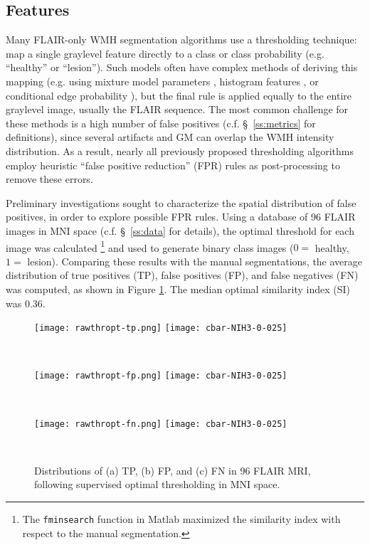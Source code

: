 \subsection{Features}
Many FLAIR-only WMH segmentation algorithms use a thresholding technique: map a single graylevel feature directly to a class or class probability (e.g. ``healthy'' or ``lesion''). Such models often have complex methods of deriving this mapping (e.g. using mixture model parameters \cite{Roura2015}, histogram features \cite{Yoo2014}, or conditional edge probability \cite{Knight2016}), but the final rule is applied equally to the entire graylevel image, usually the FLAIR sequence. The most common challenge for these methods is a high number of false positives (c.f. \S\ \ref{ss:metrics} for definitions), since several artifacts and GM can overlap the WMH intensity distribution. As a result, nearly all previously proposed thresholding algorithms employ heuristic ``false positive reduction'' (FPR) rules as post-processing to remove these errors.
\par
Preliminary investigations sought to characterize the spatial distribution of false positives, in order to explore possible FPR rules. Using a database of 96 FLAIR images in MNI space (c.f. \S\ \ref{ss:data} for details), the optimal threshold for each image was calculated%
\footnote{The \texttt{fminsearch} function in Matlab maximized the similarity index with respect to the manual segmentation.}
and used to generate binary class images ($0 =$ healthy, $1 =$ lesion). Comparing these results with the manual segmentations, the average distribution of true positives (TP), false positives (FP), and false negatives (FN) was computed, as shown in Figure \ref{fig:thropt-tpfpfn}. The median optimal similarity index (SI) was 0.36.
\begin{figure}[h]
  \centering
  \begin{subfigureside}\texttt{[image: rawthropt-tp.png]} \texttt{[image: cbar-NIH3-0-025]}\end{subfigureside}\\[0.5em]
  \begin{subfigureside}\texttt{[image: rawthropt-fp.png]} \texttt{[image: cbar-NIH3-0-025]}\end{subfigureside}\\[0.5em]
  \begin{subfigureside}\texttt{[image: rawthropt-fn.png]} \texttt{[image: cbar-NIH3-0-025]}\end{subfigureside}\\[0.5em]
  \caption{Distributions of (a) TP, (b) FP, and (c) FN in 96 FLAIR MRI, following supervised optimal thresholding in MNI space.}
  \label{fig:thropt-tpfpfn}
\end{figure}
